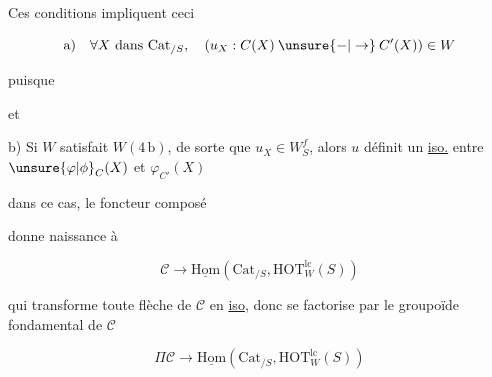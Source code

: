 
Ces conditions impliquent ceci

\[
\text{a)}\quad\forall X\ \text{dans }\mathrm{Cat}_{/S},\quad (u_X:C(X)\mathbin{\unsure{-|\to}}C'(X))\in W
\]

 puisque


et

b) Si $W$ satisfait $W(4\,\mathrm b)$, de sorte que $u_X\in W_S^f$, alors $u$ définit un \uline{iso.} entre $\unsure{\varphi|\phi}_C(X)$ et $\varphi_{C'}(X)$


 dans ce cas, le foncteur composé


 donne naissance à

\[
\mathcal C\longrightarrow\underline{\mathrm{Hom}}(\mathrm{Cat}_{/S},\mathrm{HOT}^{\mathrm{lc}}_W(S))
\]

qui transforme toute flèche de $\mathcal C$ en \uline{iso}, donc se factorise par le groupoïde fondamental de $\mathcal C$

\[
\Pi\mathcal C\longrightarrow\underline{\mathrm{Hom}}(\mathrm{Cat}_{/S},\mathrm{HOT}^{\mathrm{lc}}_W(S))
\]
